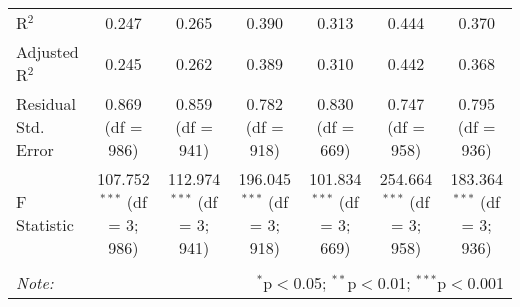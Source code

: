 \begin{table}[!htbp]
\begin{tabular}{@{\extracolsep{5pt}}lcccccc}
R$^{2}$ & 0.247 & 0.265 & 0.390 & 0.313 & 0.444 & 0.370 \\ 
Adjusted R$^{2}$ & 0.245 & 0.262 & 0.389 & 0.310 & 0.442 & 0.368 \\ 
Residual Std. Error & 0.869 (df = 986) & 0.859 (df = 941) & 0.782 (df = 918) & 0.830 (df = 669) & 0.747 (df = 958) & 0.795 (df = 936) \\ 
F Statistic & 107.752$^{***}$ (df = 3; 986) & 112.974$^{***}$ (df = 3; 941) & 196.045$^{***}$ (df = 3; 918) & 101.834$^{***}$ (df = 3; 669) & 254.664$^{***}$ (df = 3; 958) & 183.364$^{***}$ (df = 3; 936) \\ 
\hline 
\hline \\[-1.8ex] 
\textit{Note:}  & \multicolumn{6}{r}{$^{*}$p$<$0.05; $^{**}$p$<$0.01; $^{***}$p$<$0.001} \\ 
\end{tabular} 
\end{table} 
